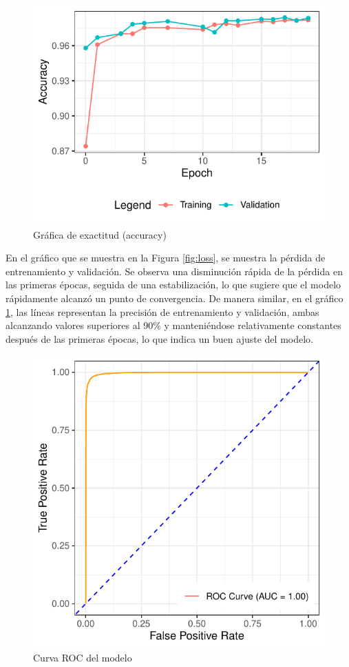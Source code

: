 \begin{figure}
 \centering
 \includegraphics[width=\columnwidth]{accuracy}
 \caption{Gráfica de exactitud (accuracy)}
 \label{fig:accuracy}
\end{figure}

En el gráfico que se muestra en la Figura \ref{fig:loss}, se muestra la pérdida de entrenamiento y validación. Se observa una disminución rápida de la pérdida en las primeras épocas, seguida de una estabilización, lo que sugiere que el modelo rápidamente alcanzó un punto de convergencia. De manera similar, en el gráfico \ref{fig:accuracy}, las líneas representan la precisión de entrenamiento y validación, ambas alcanzando valores superiores al 90\% y manteniéndose relativamente constantes después de las primeras épocas, lo que indica un buen ajuste del modelo.

\begin{figure}
 \centering
 \includegraphics[width=0.8\columnwidth]{roc}
 \caption{Curva ROC del modelo}
 \label{fig:roc}
\end{figure}


